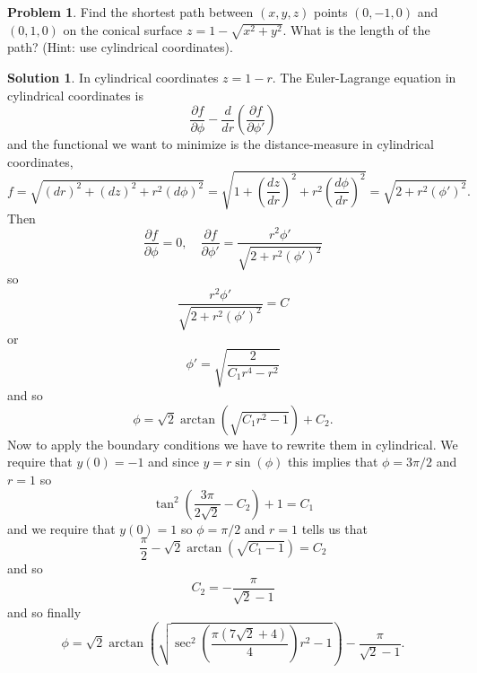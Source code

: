 \documentclass[10pt]{article}
\theoremstyle{definition}
\newtheorem{problem}{Problem}
\newtheorem{soln}{Solution}
\begin{document}
\begin{problem} Find the shortest path between $(x, y, z)$ points $(0,-1,0)$ and $(0,1,0)$ on the conical surface $z=1-\sqrt{x^2+y^2}$.
What is the length of the path? (Hint: use cylindrical coordinates).
\end{problem}
\begin{soln}
  In cylindrical coordinates $z=1-r$. The Euler-Lagrange equation in cylindrical coordinates is
  $$\frac{\partial f}{\partial \phi}-\frac{d}{dr}\left(\frac{\partial f}{\partial \phi'}\right)$$
  and the functional we want to minimize is the distance-measure in cylindrical coordinates,
  $$f=\sqrt{(dr)^2+(dz)^2+r^2(d\phi)^2}=\sqrt{1+\left(\frac{dz}{dr}\right)^2+r^2\left(\frac{d\phi}{dr}\right)^2}=\sqrt{2+r^2\left(\phi'\right)^2}.$$
  Then
  $$\frac{\partial f}{\partial \phi}=0,\quad \frac{\partial f}{\partial \phi'}=\frac{r^2\phi'}{\sqrt{2+r^2\left(\phi'\right)^2}}$$
  so
  $$\frac{r^2\phi'}{\sqrt{2+r^2\left(\phi'\right)^2}}=C$$
  or
  $$\phi'=\sqrt{\frac{2}{C_1r^4-r^2}}$$
  and so
  $$\phi=\sqrt{2}\arctan(\sqrt{C_1r^2-1})+C_2.$$
  Now to apply the boundary conditions we have to rewrite them in cylindrical. We require that $y(0)=-1$ and since 
  $y=r\sin(\phi)$ this implies that $\phi=3\pi/2$ and $r=1$ so 
  $$\tan^2(\frac{3\pi}{2\sqrt{2}}-C_2)+1=C_1$$
  and we require that $y(0)=1$ so $\phi=\pi/2$ and $r=1$ tells us that 
  $$\frac{\pi}{2}-\sqrt{2}\arctan(\sqrt{C_1-1})=C_2$$
  and so 
  $$C_2=-\frac{\pi}{\sqrt{2}-1}$$
  and so finally 
$$\phi=\sqrt{2}\arctan(\sqrt{\sec^2(\frac{\pi \left(7\sqrt{2}+4\right)}{4})r^2-1})-\frac{\pi}{\sqrt{2}-1}.$$
\end{soln}
\end{document}
